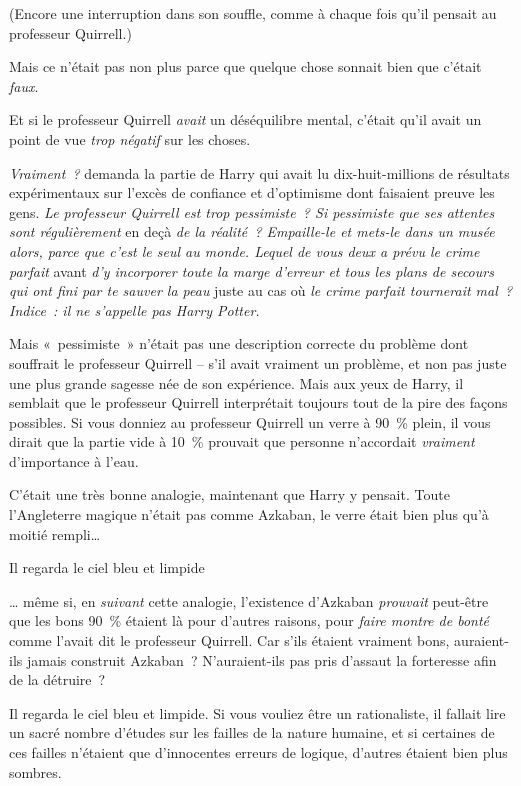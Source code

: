 (Encore une interruption dans son souffle, comme à chaque fois qu'il pensait au professeur Quirrell.)

Mais ce n'était pas non plus parce que quelque chose sonnait bien que c'était \emph{faux}.

Et si le professeur Quirrell \emph{avait} un déséquilibre mental, c'était qu'il avait un point de vue \emph{trop négatif} sur les choses.

\emph{Vraiment~?} demanda la partie de Harry qui avait lu dix-huit-millions de résultats expérimentaux sur l'excès de confiance et d'optimisme dont faisaient preuve les gens.
\emph{Le professeur Quirrell est trop pessimiste~?
Si pessimiste que ses attentes sont régulièrement} en deçà \emph{de la réalité~?
Empaille-le et mets-le dans un musée alors, parce que c'est le seul au monde.
Lequel de vous deux a prévu le crime parfait} avant \emph{d'y incorporer toute la marge d'erreur et tous les plans de secours qui ont fini par te sauver la peau} juste au cas où \emph{le crime parfait tournerait mal~?
Indice~: il ne s'appelle pas Harry Potter.}

Mais «~pessimiste~» n'était pas une description correcte du problème dont souffrait le professeur Quirrell -- s'il avait vraiment un problème, et non pas juste une plus grande sagesse née de son expérience.
Mais aux yeux de Harry, il semblait que le professeur Quirrell interprétait toujours tout de la pire des façons possibles.
Si vous donniez au professeur Quirrell un verre à 90~\% plein, il vous dirait que la partie vide à 10~\% prouvait que personne n'accordait \emph{vraiment} d'importance à l'eau.

C'était une très bonne analogie, maintenant que Harry y pensait.
Toute l'Angleterre magique n'était pas comme Azkaban, le verre était bien plus qu'à moitié rempli…

Il regarda le ciel bleu et limpide

… même si, en \emph{suivant} cette analogie, l'existence d'Azkaban \emph{prouvait} peut-être que les bons 90~\% étaient là pour d'autres raisons, pour \emph{faire montre de bonté} comme l'avait dit le professeur Quirrell.
Car s'ils étaient vraiment bons, auraient-ils jamais construit Azkaban~?
N'auraient-ils pas pris d'assaut la forteresse afin de la détruire~?

Il regarda le ciel bleu et limpide.
Si vous vouliez être un rationaliste, il fallait lire un sacré nombre d'études sur les failles de la nature humaine, et si certaines de ces failles n'étaient que d'innocentes erreurs de logique, d'autres étaient bien plus sombres.

